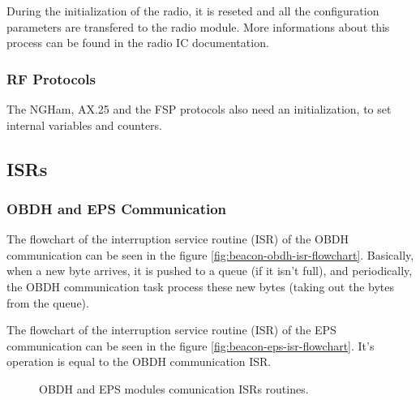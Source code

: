 During the initialization of the radio, it is reseted and all the configuration parameters are transfered to the radio module. More informations about this process can be found in the radio IC documentation.

\subsubsection{RF Protocols}

The NGHam, AX.25 and the FSP protocols also need an initialization, to set internal variables and counters.

\subsection{ISRs}


\subsubsection{OBDH and EPS Communication}

The flowchart of the interruption service routine (ISR) of the OBDH communication can be seen in the figure \ref{fig:beacon-obdh-isr-flowchart}. Basically, when a new byte arrives, it is pushed to a queue (if it isn't full), and periodically, the OBDH communication task process these new bytes (taking out the bytes from the queue).

The flowchart of the interruption service routine (ISR) of the EPS communication can be seen in the figure \ref{fig:beacon-eps-isr-flowchart}. It's operation is equal to the OBDH communication ISR.

\begin{figure}[!h]
	\begin{center}
		\qquad
		\caption{OBDH and EPS modules comunication ISRs routines.}
		\label{fig:obdh-eps-isr-flowchart}
	\end{center}
\end{figure}

